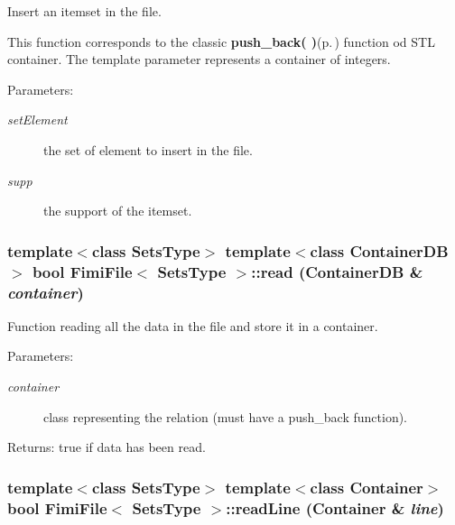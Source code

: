 Insert an itemset in the file. 

This function corresponds to the classic {\bf push\_\-back( )}{\rm (p.\,\pageref{class_fimi_file_72dce2f4bf0815c28fe52c951e51a1e0})} function od STL container. The template parameter represents a container of integers. \begin{Desc}
\item[Parameters:]
\begin{description}
\item[{\em set\-Element}]the set of element to insert in the file. \item[{\em supp}]the support of the itemset. \end{description}
\end{Desc}
\subsubsection{\setlength{\rightskip}{0pt plus 5cm}template$<$class Sets\-Type$>$ template$<$class Container\-DB$>$ bool {\bf Fimi\-File}$<$ Sets\-Type $>$::read (Container\-DB \& {\em container})\hspace{0.3cm}{\tt  [protected]}}\label{class_fimi_file_841b304183b3c6d45b7cd1eae3c3497e}


Function reading all the data in the file and store it in a container. 

\begin{Desc}
\item[Parameters:]
\begin{description}
\item[{\em container}]class representing the relation (must have a push\_\-back function). \end{description}
\end{Desc}
\begin{Desc}
\item[Returns:]true if data has been read. \end{Desc}
\subsubsection{\setlength{\rightskip}{0pt plus 5cm}template$<$class Sets\-Type$>$ template$<$class Container$>$ bool {\bf Fimi\-File}$<$ Sets\-Type $>$::read\-Line (Container \& {\em line})\hspace{0.3cm}{\tt  [protected]}}\label{class_fimi_file_64466eb74b18b382f35c2ca4a939b0f9}


